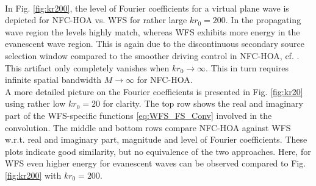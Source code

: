 \documentclass[a4paper, 10pt, twocolumn]{article}
\def\NewL{\\\noindent\hspace*{3mm}}
\begin{document}
%
%
%
%
%
%
\NewL In Fig. \ref{fig:kr200}, the level of Fourier coefficients for a virtual plane wave is depicted for NFC-HOA vs.
WFS for rather large $k r_0=200$.
In the propagating wave region the levels highly match, whereas WFS exhibits
more energy in the evanescent wave region.
This is again due to the discontinuous secondary source selection window 
compared to the smoother driving control in NFC-HOA, cf. \cite[p.95]{SchultzDiss2016}.
This artifact only completely vanishes when $k r_0\rightarrow\infty$.
This in turn requires infinite spatial bandwidth $M\rightarrow\infty$ for NFC-HOA. 
%
%
%
\NewL A more detailed picture on the Fourier coefficients is presented in Fig. 
\ref{fig:kr20} using rather low $k r_0=20$ for clarity.
The top row shows the real and imaginary part of the WFS-specific functions
\eqref{eq:WFS_FS_Conv} involved in the convolution.
The middle and bottom rows compare NFC-HOA against WFS w.r.t. real and imaginary part,
magnitude and level of Fourier coefficients.
These plots indicate good similarity, but no equivalence of the two approaches.
Here, for WFS even higher energy for evanescent waves can be observed compared to Fig. 
\ref{fig:kr200} with $k r_0=200$.
\end{document}
